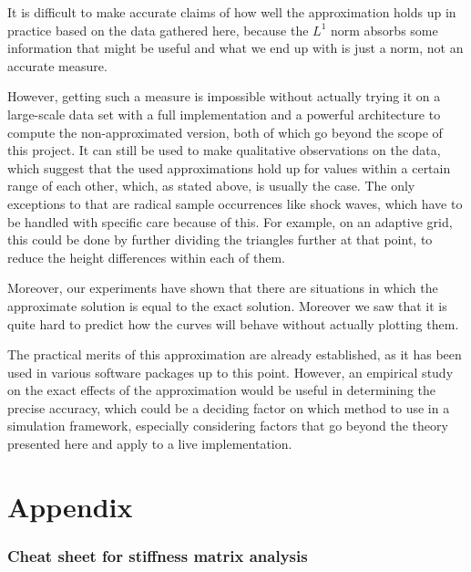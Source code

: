 \documentclass[a4paper, twoside]{article}
\begin{document}
It is difficult to make accurate claims of how well the approximation holds up in practice based on the data gathered here, because the $L^1$ norm absorbs some information that might be useful and what we end up with is just a norm, not an accurate measure.

However, getting such a measure is impossible without actually trying it on a large-scale data set with a full implementation and a powerful architecture to compute the non-approximated version, both of which go beyond the scope of this project. It can still be used to make qualitative observations on the data, which suggest that the used approximations hold up for values within a certain range of each other, which, as stated above, is usually the case. The only exceptions to that are radical sample occurrences like shock waves, which have to be handled with specific care because of this. For example, on an adaptive grid, this could be done by further dividing the triangles further at that point, to reduce the height differences within each of them.

Moreover, our experiments have shown that there are situations in which the approximate solution is equal to the exact solution. Moreover we saw that it is quite hard to predict how
the curves will behave without actually plotting them.

The practical merits of this approximation are already established, as it has been used in various software packages up to this point. However, an empirical study on the exact effects of the approximation would be useful in determining the precise accuracy, which could be a deciding factor on which method to use in a simulation framework, especially considering factors that go beyond the theory presented here and apply to a live implementation.

\clearpage




\appendix

\clearpage{}
\part{Appendix}
\label{part:cheat-sheet}

\section{Cheat sheet for stiffness matrix analysis}
\label{sec:cheat-sheet-stiffn}
\end{document}
